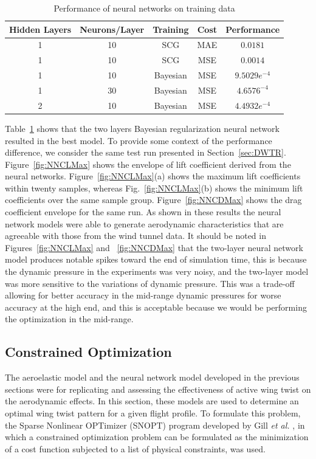 \documentclass[11pt]{ucthesis}
\begin{document}
\begin{table}[h]
\caption{Performance of neural networks on training data}
\label{tab:error}
\begin{center}
\begin{tabular}{|c||c||c||c||c|}
\hline
Hidden Layers&Neurons/Layer&Training&Cost&Performance\\
\hline
1 & 10&SCG&MAE&$0.0181$\\
\hline
1 & 10&SCG&MSE&$0.0014$\\
\hline
1 & 10&Bayesian&MSE&$9.5029e^{-4}$\\
\hline
1 & 30&Bayesian&MSE&$4.6576^{-4}$\\
\hline
2& 10&Bayesian&MSE&$4.4932e^{-4}$\\
\hline
\end{tabular}
\end{center}
\end{table}
Table~\ref{tab:error} shows that the two layers Bayesian regularization neural network resulted in the best model. To provide some context of the performance difference, we consider the same test run presented in Section~\ref{sec:DWTR}. Figure~\ref{fig:NNCLMax} shows the envelope of lift coefficient derived from the neural networks. Figure~\ref{fig:NNCLMax}(a) shows the maximum lift coefficients within twenty samples, whereas Fig.~\ref{fig:NNCLMax}(b) shows the minimum lift coefficients over the same sample group. Figure~\ref{fig:NNCDMax} shows the drag coefficient envelope for the same run. As shown in these results the neural network models were able to generate aerodynamic characteristics that are agreeable with those from the wind tunnel data. It should be noted in Figures~\ref{fig:NNCLMax} and ~\ref{fig:NNCDMax} that the two-layer neural network model produces notable spikes toward the end of simulation time, this is because the dynamic pressure in the experiments was very noisy, and the two-layer model was more sensitive to the variations of dynamic pressure. This was a trade-off allowing for better accuracy in the mid-range dynamic pressures for worse accuracy at the high end, and this is acceptable because we would be performing the optimization in the mid-range. 

\subsection{Constrained Optimization}
\label{sec:Copt}
The aeroelastic model and the neural network model developed in the previous sections were for replicating and assessing the effectiveness of active wing twist on the aerodynamic effects. In this section, these models are used to determine an optimal wing twist pattern for a given flight profile. To formulate this problem, the Sparse Nonlinear OPTimizer (SNOPT) program developed by Gill {\it et al.} \cite{gill2005snopt}, in which a constrained optimization problem can be formulated as the minimization of a cost function subjected to a list of physical constraints, was used.     
\end{document}
